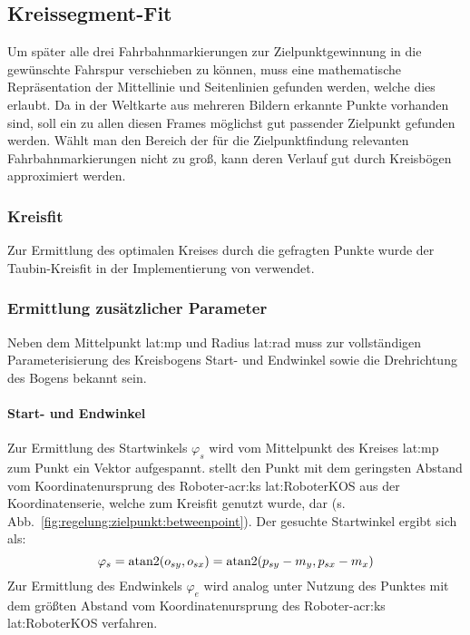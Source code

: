 \subsection{Kreissegment-Fit} \label{regelung:zielpunkt:kreissegment-fit}
Um später alle drei Fahrbahnmarkierungen zur Zielpunktgewinnung in die gewünschte Fahrspur verschieben zu können, muss eine mathematische Repräsentation der Mittellinie und Seitenlinien gefunden werden, welche dies erlaubt. Da in der Weltkarte aus mehreren Bildern erkannte Punkte vorhanden sind, soll ein zu allen diesen Frames möglichst gut passender Zielpunkt gefunden werden. Wählt man den Bereich der für die Zielpunktfindung relevanten Fahrbahnmarkierungen nicht zu groß, kann deren Verlauf gut durch Kreisbögen approximiert werden. 

\subsubsection{Kreisfit} 
Zur Ermittlung des optimalen Kreises durch die gefragten Punkte wurde der Taubin-Kreisfit \autocite{taubinEstimationPlanarCurves1991} in der Implementierung von \autocite{nikolaichernovMATLABCodesFitting2012} verwendet. 

\subsubsection{Ermittlung zusätzlicher Parameter}
Neben dem Mittelpunkt \gls{lat:mp} und Radius \gls{lat:rad} muss zur vollständigen Parameterisierung des Kreisbogens Start- und Endwinkel sowie die Drehrichtung des Bogens bekannt sein.

\paragraph{Start- und Endwinkel}
Zur Ermittlung des Startwinkels \( \varphi_s \) wird vom Mittelpunkt des Kreises \gls{lat:mp} zum Punkt  ein Vektor  aufgespannt.  stellt den Punkt mit dem geringsten Abstand vom Koordinatenursprung des Roboter-\gls{acr:ks} \gls{lat:RoboterKOS} aus der Koordinatenserie, welche zum Kreisfit genutzt wurde, dar (s. Abb.~\ref{fig:regelung:zielpunkt:betweenpoint}). Der gesuchte Startwinkel ergibt sich als:
\begin{equation}
\varphi_s =
\operatorname{atan2}(o_{sy}, o_{sx}) = 
\operatorname{atan2}(p_{sy}-m_{y}, p_{sx}-m_{x})
\end{equation}
Zur Ermittlung des Endwinkels \( \varphi_e \) wird analog unter Nutzung des Punktes mit dem größten Abstand vom Koordinatenursprung des Roboter-\gls{acr:ks} \gls{lat:RoboterKOS} verfahren.

